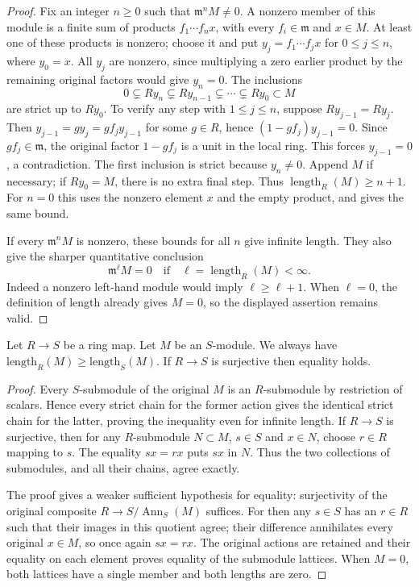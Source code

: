 \begin{proof}
Fix an integer $n\geq0$ such that $\mathfrak m^nM\neq0$.
A nonzero member of this module is a finite sum of products
$f_1\cdots f_nx$, with every $f_i\in\mathfrak m$ and $x\in M$.
At least one of these products is nonzero; choose it and put
$y_j=f_1\cdots f_jx$ for $0\leq j\leq n$, where $y_0=x$.
All $y_j$ are nonzero, since multiplying a zero earlier product
by the remaining original factors would give $y_n=0$.
The inclusions
$$
0\subsetneq Ry_n\subsetneq Ry_{n-1}\subsetneq\cdots
\subsetneq Ry_0\subset M
$$
are strict up to $Ry_0$. To verify any step with $1\leq j\leq n$,
suppose $Ry_{j-1}=Ry_j$. Then
$y_{j-1}=g y_j=g f_j y_{j-1}$ for some $g\in R$, hence
$(1-gf_j)y_{j-1}=0$. Since $gf_j\in\mathfrak m$, the original
factor $1-gf_j$ is a unit in the local ring. This forces
$y_{j-1}=0$, a contradiction. The first inclusion is strict
because $y_n\neq0$. Append $M$ if necessary; if $Ry_0=M$,
there is no extra final step. Thus
$\operatorname{length}_R(M)\geq n+1$.
For $n=0$ this uses the nonzero element $x$ and the empty product,
and gives the same bound.

If every $\mathfrak m^nM$ is nonzero, these bounds for all $n$
give infinite length. They also give the sharper quantitative
conclusion
$$
\mathfrak m^\ell M=0
\quad\text{if}\quad
\ell=\operatorname{length}_R(M)<\infty.
$$
Indeed a nonzero left-hand module would imply
$\ell\geq\ell+1$. When $\ell=0$, the definition of length
already gives $M=0$, so the displayed assertion remains valid.
\end{proof}

\begin{lemma}
\label{lemma-length-independent}
Let $R \to S$ be a ring map. Let $M$ be an $S$-module.
We always have $\text{length}_R(M) \geq \text{length}_S(M)$.
If $R \to S$ is surjective then equality holds.
\end{lemma}

\begin{proof}
Every $S$-submodule of the original $M$ is an $R$-submodule by
restriction of scalars. Hence every strict chain for the former
action gives the identical strict chain for the latter, proving
the inequality even for infinite length.
If $R\to S$ is surjective, then for any $R$-submodule $N\subset M$,
$s\in S$ and $x\in N$, choose $r\in R$ mapping to $s$.
The equality $sx=rx$ puts $sx$ in $N$. Thus the two collections
of submodules, and all their chains, agree exactly.

The proof gives a weaker sufficient hypothesis for equality:
surjectivity of the original composite
$R\to S/\operatorname{Ann}_S(M)$ suffices.
For then any $s\in S$ has an $r\in R$ such that their images
in this quotient agree; their difference annihilates every
original $x\in M$, so once again $sx=rx$.
The original actions are retained and their equality on each
element proves equality of the submodule lattices. When $M=0$,
both lattices have a single member and both lengths are zero.
\end{proof}

